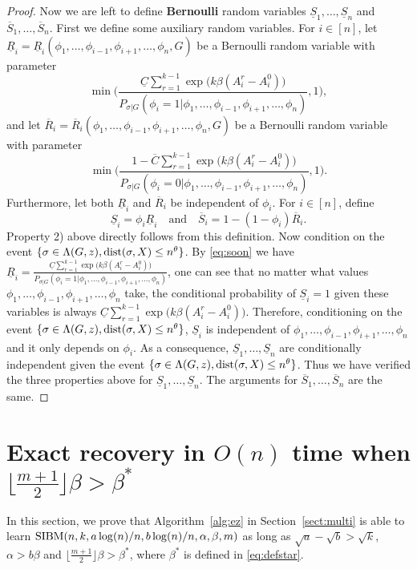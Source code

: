 \documentclass{article}
\begin{document}
\begin{proof}
	Now we are left to define {\bf Bernoulli} random variables $\underline{S}_1,\dots, \underline{S}_n$ and $\overline{S}_1,\dots,\overline{S}_n$.
	First we define some auxiliary random variables.
	For $i\in[n]$, let 
	$\underline{R}_i=\underline{R}_i(\phi_1,\dots,\phi_{i-1},\phi_{i+1},\dots,\phi_n,G)$ be a Bernoulli random variable with parameter 
	$$
	\min \Big( \frac{\underline{C}
		\sum_{r=1}^{k-1}\exp\big(k\beta (A^r_i-A^0_i) \big)}{P_{\sigma|G}(\phi_i=1|\phi_1,\dots,\phi_{i-1},\phi_{i+1},\dots,\phi_n)} , 1 \Big) ,
	$$
	and let 
	$\overline{R}_i=\overline{R}_i(\phi_1,\dots,\phi_{i-1},\phi_{i+1},\dots,\phi_n,G)$ be a Bernoulli random variable with parameter 
	$$
	\min \Big(\frac{1- \overline{C}
		\sum_{r=1}^{k-1}\exp\big(k\beta (A^r_i-A^0_i) \big)}{P_{\sigma|G}(\phi_i=0|\phi_1,\dots,\phi_{i-1},\phi_{i+1},\dots,\phi_n)} , 1 \Big) .
	$$
	Furthermore, let both $\underline{R}_i$ and $\overline{R}_i$ be independent of $\phi_i$.
	For $i\in[n]$, define
	$$
	\underline{S}_i=\phi_i \underline{R}_i \quad
	\text{and} \quad
	\overline{S}_i = 1- (1-\phi_i) \overline{R}_i .
	$$
	Property 2) above directly follows from this definition.
	Now condition on the event $\{\sigma\in \Lambda(G,z) ,\operatorname{dist}(\sigma, X) \le n^{\theta}\}$.
	By \eqref{eq:soon} we have $\underline{R}_i =\frac{\underline{C}
		\sum_{r=1}^{k-1}\exp\big(k\beta (A^r_i-A^0_i) \big)}{P_{\sigma|G}(\phi_i=1|\phi_1,\dots,\phi_{i-1},\phi_{i+1},\dots,\phi_n)} $, one can see that no matter what values $\phi_1,\dots,\phi_{i-1},\phi_{i+1},\dots,\phi_n$ take, the conditional probability of $\underline{S}_i=1$ given these variables is always $\underline{C}
	\sum_{r=1}^{k-1}\exp\big(k\beta (A^r_i-A^0_i) \big)$. Therefore, conditioning on the event $\{\sigma\in \Lambda(G,z) ,\operatorname{dist}(\sigma, X) \le n^{\theta}\}$, $\underline{S}_i$ is independent of $\phi_1,\dots,\phi_{i-1},\phi_{i+1},\dots,\phi_n$ and it only depends on $\phi_i$. As a consequence, $\underline{S}_1,\dots, \underline{S}_n$ are conditionally independent given the event $\{\sigma\in \Lambda(G,z) ,\operatorname{dist}(\sigma, X) \le n^{\theta}\}$. Thus we have verified the three properties above for $\underline{S}_1,\dots, \underline{S}_n$. The arguments for $\overline{S}_1,\dots, \overline{S}_n$ are the same.
\end{proof}
\section{Exact recovery in $O(n)$ time when $\lfloor \frac{m+1}{2} \rfloor \beta>\beta^\ast$}
\label{sect:direct}
In this section, we prove that Algorithm~\ref{alg:ez} in Section~\ref{sect:multi} is able to learn $\SIBM(n,k,a\log(n)/n, \linebreak[4] b\log(n)/n,\alpha,\beta, m)$ as long as $\sqrt{a}-\sqrt{b} > \sqrt{k}$,  $\alpha>b\beta$ and $\lfloor \frac{m+1}{2} \rfloor \beta>\beta^\ast$, where $\beta^\ast$ is defined in \eqref{eq:defstar}.
\end{document}
